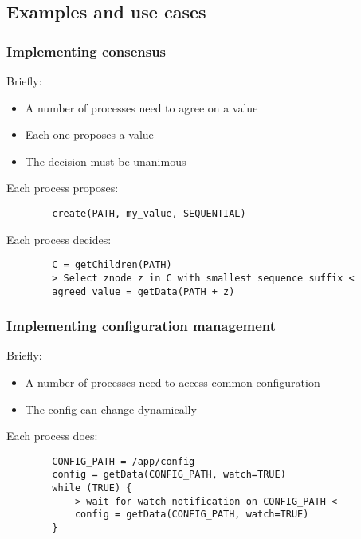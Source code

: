 \documentclass{beamer}
\begin{document}
\subsection{Examples and use cases}
\begin{frame}[fragile]
	\frametitle{Implementing consensus}
	Briefly:
	\begin{itemize}
		\item A number of processes need to agree on a value
		\item Each one proposes a value
		\item The decision must be unanimous
	\end{itemize}

	\vspace{7pt}

	Each process proposes:
	\begin{verbatim}
		create(PATH, my_value, SEQUENTIAL)
	\end{verbatim}

	\vspace{7pt}

	Each process decides:
	\begin{verbatim}
		C = getChildren(PATH)
		> Select znode z in C with smallest sequence suffix <
		agreed_value = getData(PATH + z)
	\end{verbatim}
\end{frame}

\begin{frame}[fragile]
	\frametitle{Implementing configuration management}
	Briefly:
	\begin{itemize}
		\item A number of processes need to access common configuration
		\item The config can change dynamically
	\end{itemize}
	
	\vspace{7pt}
	
	Each process does:
	\begin{verbatim}
		CONFIG_PATH = /app/config
		config = getData(CONFIG_PATH, watch=TRUE)
		while (TRUE) {
		    > wait for watch notification on CONFIG_PATH <
		    config = getData(CONFIG_PATH, watch=TRUE)
		}
	\end{verbatim}
\end{frame}
\end{document}
